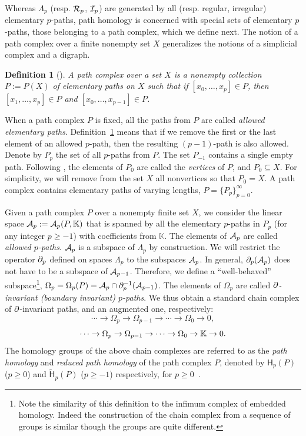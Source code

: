 \documentclass{amsart}
\newtheorem{definition}[theorem]{Definition}
\newcommand{\K}{\mathbb{K}}
\newcommand{\Hgroup}	     {\mathsf{H}}
\newcommand{\bdr}{\mm{\mathrm{\partial}}}
\newcommand {\mm}[1]        {\ifmmode{#1}\else{\mbox{\(#1\)}}\fi}
\newcommand{\Kspace}        {\mm{{\mathbb K}}}
\newcommand{\Acal}        {\mm{\mathcal A}}
\newcommand{\Rcal}        {\mm{\mathcal R}}
\newcommand{\Ical}        {\mm{\mathcal I}}
\begin{document}
Whereas $\Lambda_p$ (resp. $\Rcal_p$, $\Ical_p$) are generated by all (resp. regular, irregular) elementary $p$-paths, path homology is concerned with special sets of elementary $p$-paths, those belonging to a path complex, which we define next.
The notion of a path complex over a finite nonempty set $X$ generalizes the notions of a simplicial complex and a digraph. 
\begin{definition}
[{\cite[Definition 3.1]{GrigoryanLinMuranov2020}}]
A \emph{path complex} over a set $X$ is a nonempty collection $P:=P(X)$ of elementary paths on $X$ such that if $[x_0, \dots, x_p] \in P$, then $[x_1, \dots, x_p] \in P$ and $[x_0, \dots, x_{p-1}] \in P$. 
\label{def:path-complex} 
\end{definition}
When a path complex $P$ is fixed, all the paths from $P$ are called \emph{allowed elementary paths}. 
Definition~\ref{def:path-complex} means that if we remove the first or the last element of an allowed $p$-path, then the resulting $(p-1)$-path is also allowed.
Denote by $P_p$ the set of all $p$-paths from $P$.
The set $P_{-1}$ contains a single empty path.  
Following  \cite{GrigoryanLinMuranov2020}, the elements of $P_0$ are called the \emph{vertices} of $P$, and $P_0 \subseteq X$. 
For simplicity, we will remove from the set $X$ all nonvertices so that $P_0 = X$. 
A path complex contains elementary paths of varying lengths, $P = \{P_p\}_{p=0}^{\infty}$.  
 
Given a path complex $P$ over a nonempty finite set $X$, we consider the linear space $\Acal_p: = \Acal_p(P, \K)$ that is spanned by all the elementary $p$-paths in $P_p$ (for any integer $p \geq -1$) with coefficients from $\K$. 
The elements of $\Acal_p$ are called \emph{allowed $p$-paths}. 
$\Acal_p$ is a subspace of $\Lambda_p$ by construction. 
We will restrict the operator $\bdr_p$ defined on spaces $\Lambda_p$ to the subspaces $\Acal_p$. 
In general,  $\bdr_p (\Acal_p)$ does not have to be a subspace of $\Acal_{p-1}$.
Therefore, we define a ``well-behaved'' subspace\footnote{Note the similarity of this definition to the infimum complex of embedded homology. Indeed the construction of the chain complex from a sequence of groups is similar though the groups are quite different.}, 
$\Omega_p = \Omega_p(P) = \Acal_p \cap \bdr_p^{-1}(\Acal_{p-1})$.
The elements of $\Omega_p$ are called \emph{$\bdr$-invariant (boundary invariant) $p$-paths}.
We thus obtain a standard chain complex of $\bdr$-invariant paths, and an augmented one, respectively:  
\[
\cdots  \to \Omega_{p} \to \Omega_{p-1} \to \cdots \to \Omega_{0} \to 0,   
\]
\[
\cdots  \to \Omega_{p} \to \Omega_{p-1} \to \cdots \to \Omega_{0} \to \Kspace \to 0.  
\]
The homology groups of the above chain complexes are referred to as the \emph{path homology} and  \emph{reduced path homology} of the path complex $P$, denoted by $\Hgroup_p(P)$ ($p \geq 0$) and  $\tilde{\Hgroup}_p(P)$ ($p \geq -1$) respectively, for $p \geq 0$~\cite{GrigoryanLinMuranov2020}.
\end{document}

